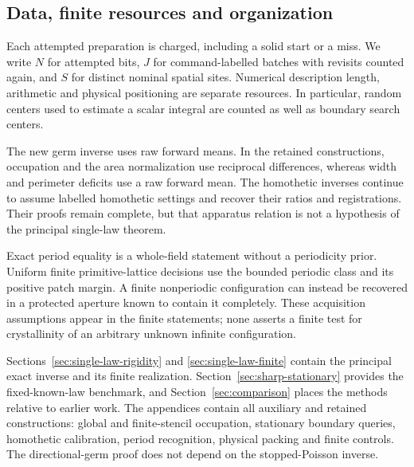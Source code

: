 \subsection{Data, finite resources and organization}
Each attempted preparation is charged, including a solid start or a
miss. We write $N$ for attempted bits, $J$ for command-labelled batches
with revisits counted again, and $S$ for distinct nominal spatial
sites. Numerical description length, arithmetic and physical
positioning are separate resources. In particular, random centers
used to estimate a scalar integral are counted as well as boundary
search centers.

The new germ inverse uses raw forward means. In the retained
constructions, occupation and the area normalization use reciprocal
differences, whereas width and perimeter deficits use a raw forward
mean. The homothetic inverses continue to assume labelled homothetic
settings and recover their ratios and registrations. Their proofs
remain complete, but that apparatus relation is not a hypothesis of
the principal single-law theorem.

Exact period equality is a whole-field statement without a periodicity
prior. Uniform finite primitive-lattice decisions use the bounded
periodic class and its positive patch margin. A finite nonperiodic
configuration can instead be recovered in a protected aperture known
to contain it completely. These acquisition assumptions appear in
the finite statements; none asserts a finite test for crystallinity
of an arbitrary unknown infinite configuration.

Sections~\ref{sec:single-law-rigidity} and
\ref{sec:single-law-finite} contain the principal exact inverse and
its finite realization. Section~\ref{sec:sharp-stationary} provides
the fixed-known-law benchmark, and Section~\ref{sec:comparison}
places the methods relative to earlier work. The appendices contain
all auxiliary and retained constructions: global and finite-stencil
occupation, stationary boundary queries, homothetic calibration,
period recognition, physical packing and finite controls. The
directional-germ proof does not depend on the stopped-Poisson inverse.
